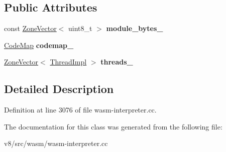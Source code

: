 \subsection*{Public Attributes}
\begin{DoxyCompactItemize}
\item 
\mbox{\label{classv8_1_1internal_1_1wasm_1_1WasmInterpreterInternals_aaf1cf8c64fca1c38f3745ad952e3cae9}} 
const \mbox{\hyperlink{classv8_1_1internal_1_1ZoneVector}{Zone\+Vector}}$<$ uint8\+\_\+t $>$ {\bfseries module\+\_\+bytes\+\_\+}
\item 
\mbox{\label{classv8_1_1internal_1_1wasm_1_1WasmInterpreterInternals_af708773a30c6708c526502d74b085173}} 
\mbox{\hyperlink{classv8_1_1internal_1_1wasm_1_1CodeMap}{Code\+Map}} {\bfseries codemap\+\_\+}
\item 
\mbox{\label{classv8_1_1internal_1_1wasm_1_1WasmInterpreterInternals_a9de27f625fdcb4dc65c66616a2fd54cd}} 
\mbox{\hyperlink{classv8_1_1internal_1_1ZoneVector}{Zone\+Vector}}$<$ \mbox{\hyperlink{classv8_1_1internal_1_1wasm_1_1ThreadImpl}{Thread\+Impl}} $>$ {\bfseries threads\+\_\+}
\end{DoxyCompactItemize}


\subsection{Detailed Description}


Definition at line 3076 of file wasm-\/interpreter.\+cc.



The documentation for this class was generated from the following file\+:\begin{DoxyCompactItemize}
\item 
v8/src/wasm/wasm-\/interpreter.\+cc\end{DoxyCompactItemize}
